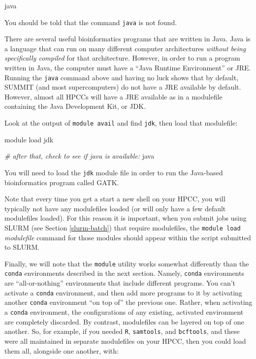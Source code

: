 \documentclass[]{krantz}
\makeatletter
\newenvironment{Shaded}{\begin{snugshade}}{\end{snugshade}}
\newcommand{\CommentTok}[1]{\textcolor[rgb]{0.37,0.37,0.37}{\textit{#1}}}
\newcommand{\ExtensionTok}[1]{#1}
\newcommand{\NormalTok}[1]{#1}
\newenvironment{kframe}{%
\medskip{}
\setlength{\fboxsep}{.8em}
 \def\at@end@of@kframe{}%
 \ifinner\ifhmode%
  \def\at@end@of@kframe{\end{minipage}}%
  \begin{minipage}{\columnwidth}%
 \fi\fi%
 \def\FrameCommand##1{\hskip\@totalleftmargin \hskip-\fboxsep
 \colorbox{shadecolor}{##1}\hskip-\fboxsep
     \hskip-\linewidth \hskip-\@totalleftmargin \hskip\columnwidth}%
 \MakeFramed {\advance\hsize-\width
   \@totalleftmargin\z@ \linewidth\hsize
   \@setminipage}}%
 {\par\unskip\endMakeFramed%
 \at@end@of@kframe}
\renewenvironment{Shaded}{\begin{kframe}}{\end{kframe}}
\makeatother
\begin{document}
\begin{Shaded}
\begin{Highlighting}[]
\ExtensionTok{java}
\end{Highlighting}
\end{Shaded}

You should be told that the command \texttt{java} is not found.

There are several useful bioinformatics programs that are written in Java.
Java is a language that can run on many different computer architectures
\emph{without being specifically compiled} for that architecture. However, in order to
run a program written in Java, the computer must have a ``Java Runtime Environment'' or JRE.
Running the \texttt{java} command above and having no luck shows that by default, SUMMIT (and most
supercomputers) do not have a JRE available by default. However, almost all HPCCs will
have a JRE available as in a modulefile containing the Java Development Kit, or JDK.

Look at the output of \texttt{module\ avail} and find \texttt{jdk}, then load that modulefile:

\begin{Shaded}
\begin{Highlighting}[]
\ExtensionTok{module}\NormalTok{ load jdk}

\CommentTok{# after that, check to see if java is available:}
\ExtensionTok{java}
\end{Highlighting}
\end{Shaded}

You will need to load the \texttt{jdk} module file in order to run the Java-based bioinformatics
program called GATK.

Note that every time you get a start a new shell on your HPCC, you will typically not have
any modulefiles loaded (or will only have a few default modulefiles loaded). For this reason
it is important, when you submit jobs using SLURM (see Section \ref{slurm-batch}) that
require modulefiles, the \texttt{module\ load} \emph{modulefile} command for those modules should appear
within the script submitted to SLURM.

Finally, we will note that the \texttt{module} utility works somewhat differently than the
\texttt{conda} environments described in the next section. Namely, \texttt{conda} environments
are ``all-or-nothing'' environments that include different programs. You can't activate
a \texttt{conda} environment, and then add more programs to it by activating another
\texttt{conda} environment ``on top of'' the previous one. Rather, when activating a \texttt{conda}
environment, the configurations of any existing, activated environment are completely
discarded. By contrast, modulefiles can be layered on top of one another. So, for example,
if you needed \texttt{R}, \texttt{samtools}, and \texttt{bcftools}, and these were all maintained in
separate modulefiles on your HPCC, then you could load them all, alongside one another,
with:
\end{document}
